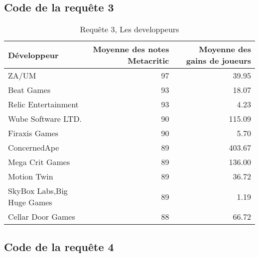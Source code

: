 \documentclass[mstat,12pt]{unswthesis}
\begin{document}
\hypertarget{code-de-la-requuxeate-3}{%
\subsection*{Code de la requête 3}\label{code-de-la-requuxeate-3}}

\begingroup\fontsize{10}{12}\selectfont

\begin{longtable}[t]{>{\raggedright\arraybackslash}p{5cm}rr}
\caption{\label{tab:results-table developpeurs}Requête 3, Les developpeurs}\\
\toprule
Développeur & Moyenne des notes Metacritic & Moyenne des gains de joueurs\\
\midrule
ZA/UM & 97 & 39.95\\
Beat Games & 93 & 18.07\\
Relic Entertainment & 93 & 4.23\\
Wube Software LTD. & 90 & 115.09\\
Firaxis Games & 90 & 5.70\\
\addlinespace
ConcernedApe & 89 & 403.67\\
Mega Crit Games & 89 & 136.00\\
Motion Twin & 89 & 36.72\\
SkyBox Labs,Big Huge Games & 89 & 1.19\\
Cellar Door Games & 88 & 66.72\\
\bottomrule
\end{longtable}
\endgroup{}

\hypertarget{code-de-la-requuxeate-4}{%
\subsection*{Code de la requête 4}\label{code-de-la-requuxeate-4}}
\end{document}
